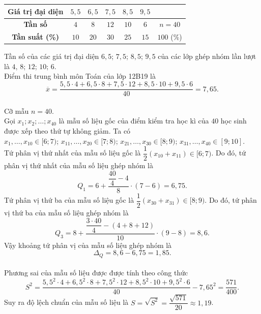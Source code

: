 \begin{ex}
{\begin{itemchoice}
\begin{center}
\begin{tabular}{|c|c|c|c|c|c|c|}
					\hline
					\bf Giá trị đại diện &$5{,}5$& $6{,}5$&$7{,}5$&$8{,}5$&$9{,}5$&\\
					\hline
					\bf Tần số & $4$ & $8$ & $12$ & $10$ & $6$ &$n=40$\\
					\hline
					\bf Tần suất (\%) & $10$ &$20$&$30$&$25$&$15$&$100$ (\%)\\
					\hline
				\end{tabular}
			\end{center}
			Tần số của các giá trị đại diện $6{,}5$; $7{,}5$; $8{,}5$; $9{,}5$ của các lớp ghép nhóm lần lượt là $4$, $8$; $12$; $10$; $6$.
			\\
			 Điểm thi trung bình môn Toán của lớp 12B19 là
			$$\overline{x}= \dfrac{5{,}5\cdot4 +6{,}5\cdot8+7{,}5\cdot12+8{,}5\cdot10+9{,}5\cdot6}{40}=7{,}65.$$
			\\
			Cỡ mẫu $n=40$.\\
			Gọi $x_1 ; x_2 ; \ldots ; x_{40}$ là mẫu số liệu gốc của điểm kiểm tra học kì của $40$ học sinh được xếp theo thứ tự không giảm.
			Ta có\\ $x_1,\ldots, x_{10} \in[6;7)$; $x_{11}, \ldots, x_{20} \in[7;8)$; $x_{21}, \ldots, x_{30} \in[8;9)$; $x_{31}, \ldots, x_{40} \in[9;10]$.\\
			Tứ phân vị thứ nhất của mẫu số liệu gốc là $\dfrac{1}{2}\left(x_{10}+x_{11}\right) \in[6;7)$. Do đó, tứ phân vị thứ nhất của mẫu số liệu ghép nhóm là
			$$
			Q_1=6+\dfrac{\dfrac{40}{4}-4}{8} \cdot(7-6)=6{,}75.
			$$			
			Tứ phân vị thứ ba của mẫu số liệu gốc là $\dfrac{1}{2}\left(x_{30}+x_{31}\right) \in[8;9)$. Do đó, tứ phân vị thứ ba của mẫu số liệu ghép nhóm là
			$$
			Q_3=8+\dfrac{\dfrac{3\cdot40}{4}-(4+8+12)}{10} \cdot(9-8)=8{,}6.
			$$			
			Vậy khoảng tứ phân vị của mẫu số liệu ghép nhóm là
			$$
			\Delta_Q=8{,}6-6{,}75=1{,}85.
			$$
			 \\
			Phương sai của mẫu số liệu được được tính theo công thức
			$$S^2=\dfrac{5{,}5^2\cdot4 +6{,}5^2\cdot8+7{,}5^2\cdot12+8{,}5^2\cdot10+9{,}5^2\cdot6}{40}-7{,}65^2=\dfrac{571}{400}.$$
			Suy ra độ lệch chuẩn của mẫu số liệu là $S=\sqrt{S^2}=\dfrac{\sqrt{571}}{20}\approx 1{,}19$.
		\end{itemchoice}
	}
\end{ex}

